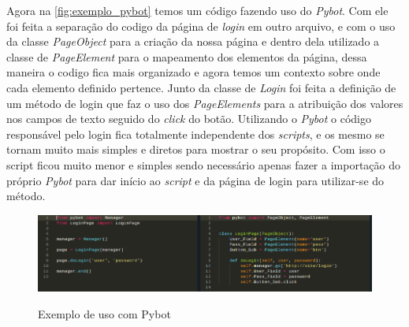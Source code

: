     Agora na \autoref{fig:exemplo_pybot} temos um código fazendo uso do \textit{Pybot}. Com ele foi feita a separação do codigo da página de
    \textit{login} em outro arquivo, e com o uso da classe \textit{PageObject} para a criação da nossa página e dentro dela utilizado a classe de
    \textit{PageElement} para o mapeamento dos elementos da página, dessa maneira o codigo fica mais organizado e agora temos um contexto sobre
    onde cada elemento definido pertence. Junto da classe de \textit{Login} foi feita a definição de um método de login que faz o uso dos \textit{PageElements}
    para a atribuição dos valores nos campos de texto seguido do \textit{click} do botão. Utilizando o \textit{Pybot} o código responsável pelo login
    fica totalmente independente dos \textit{scripts}, e os mesmo se tornam muito mais simples e diretos para mostrar o seu propósito. Com isso o script ficou
    muito menor e simples sendo necessário apenas fazer a importação do próprio \textit{Pybot} para dar início ao \textit{script} e da página de login para utilizar-se do método.

    \begin{figure}[H]
        \vspace*{0,3cm}
        \centering
        \caption{Exemplo de uso com Pybot}
        \includegraphics[width=1\textwidth]{./04-figuras/exemplo_pybot}
        \label{fig:exemplo_pybot}
    \end{figure}




